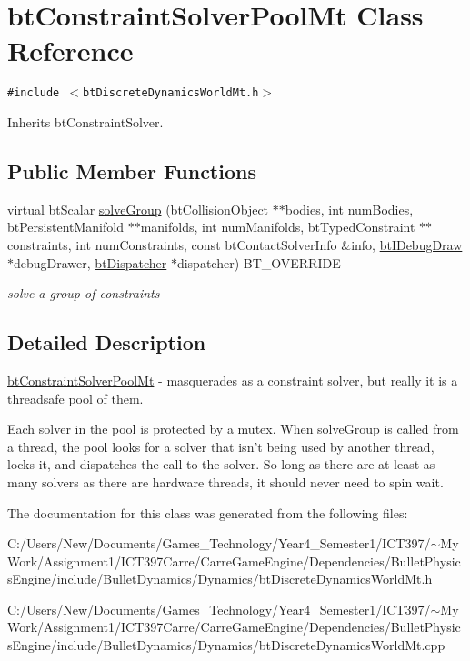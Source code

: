 \hypertarget{classbt_constraint_solver_pool_mt}{
\section{btConstraintSolverPoolMt Class Reference}
\label{classbt_constraint_solver_pool_mt}
}
{\tt \#include $<$btDiscreteDynamicsWorldMt.h$>$}

Inherits btConstraintSolver.

\subsection*{Public Member Functions}
\begin{CompactItemize}
\item 
\hypertarget{classbt_constraint_solver_pool_mt_9ec644111717d8455042b606181f7883}{
virtual btScalar \hyperlink{classbt_constraint_solver_pool_mt_9ec644111717d8455042b606181f7883}{solveGroup} (btCollisionObject $\ast$$\ast$bodies, int numBodies, btPersistentManifold $\ast$$\ast$manifolds, int numManifolds, btTypedConstraint $\ast$$\ast$constraints, int numConstraints, const btContactSolverInfo \&info, \hyperlink{classbt_i_debug_draw}{btIDebugDraw} $\ast$debugDrawer, \hyperlink{classbt_dispatcher}{btDispatcher} $\ast$dispatcher) BT\_\-OVERRIDE}
\label{classbt_constraint_solver_pool_mt_9ec644111717d8455042b606181f7883}

\begin{CompactList}\small\item\em solve a group of constraints \item\end{CompactList}\end{CompactItemize}


\subsection{Detailed Description}
\hyperlink{classbt_constraint_solver_pool_mt}{btConstraintSolverPoolMt} - masquerades as a constraint solver, but really it is a threadsafe pool of them.

Each solver in the pool is protected by a mutex. When solveGroup is called from a thread, the pool looks for a solver that isn't being used by another thread, locks it, and dispatches the call to the solver. So long as there are at least as many solvers as there are hardware threads, it should never need to spin wait. 

The documentation for this class was generated from the following files:\begin{CompactItemize}
\item 
C:/Users/New/Documents/Games\_\-Technology/Year4\_\-Semester1/ICT397/$\sim$My Work/Assignment1/ICT397Carre/CarreGameEngine/Dependencies/BulletPhysicsEngine/include/BulletDynamics/Dynamics/btDiscreteDynamicsWorldMt.h\item 
C:/Users/New/Documents/Games\_\-Technology/Year4\_\-Semester1/ICT397/$\sim$My Work/Assignment1/ICT397Carre/CarreGameEngine/Dependencies/BulletPhysicsEngine/include/BulletDynamics/Dynamics/btDiscreteDynamicsWorldMt.cpp\end{CompactItemize}
